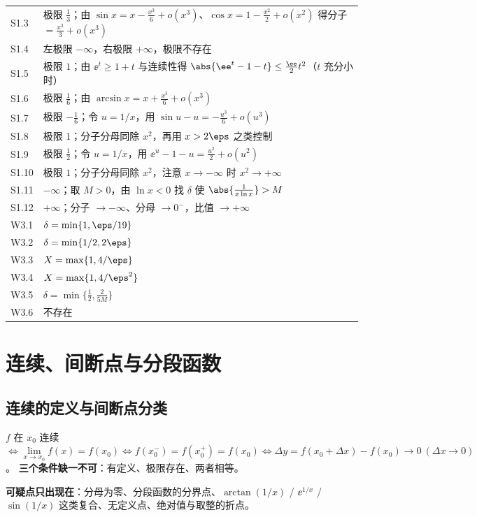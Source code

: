 \documentclass[11pt,a4paper]{ctexart}
\begin{document}
{\begin{longtable}{@{}p{1.6cm}p{13.0cm}@{}}
S1.3 & 极限 $\frac13$；由 $\sin x=x-\frac{x^{3}}{6}+o(x^{3})$、$\cos x=1-\frac{x^{2}}{2}+o(x^{2})$ 得分子 $=\frac{x^{3}}{3}+o(x^{3})$ \\
S1.4 & 左极限 $-\infty$，右极限 $+\infty$，极限不存在 \\
S1.5 & 极限 $1$；由 $\ee^{t}\geq1+t$ 与连续性得 $\abs{\ee^{t}-1-t}\leq\frac{\ee}{2}t^{2}$（$t$ 充分小时） \\
S1.6 & 极限 $\frac16$；由 $\arcsin x=x+\frac{x^{3}}{6}+o(x^{3})$ \\
S1.7 & 极限 $-\frac16$；令 $u=1/x$，用 $\sin u-u=-\frac{u^{3}}{6}+o(u^{3})$ \\
S1.8 & 极限 $1$；分子分母同除 $x^{2}$，再用 $x>2\eps$ 之类控制 \\
S1.9 & 极限 $\frac12$；令 $u=1/x$，用 $\ee^{u}-1-u=\frac{u^{2}}{2}+o(u^{2})$ \\
S1.10 & 极限 $1$；分子分母同除 $x^{2}$，注意 $x\to-\infty$ 时 $x^{2}\to+\infty$ \\
S1.11 & $-\infty$；取 $M>0$，由 $\ln x<0$ 找 $\delta$ 使 $\abs{\frac{1}{x\ln x}}>M$ \\
S1.12 & $+\infty$；分子 $\to-\infty$、分母 $\to0^{-}$，比值 $\to+\infty$ \\
W3.1 & $\delta=\min\{1,\eps/19\}$ \\
W3.2 & $\delta=\min\{1/2,2\eps\}$ \\
W3.3 & $X=\max\{1,4/\eps\}$ \\
W3.4 & $X=\max\{1,4/\eps^2\}$ \\
W3.5 & $\delta=\min\{\frac12,\frac{2}{5M}\}$ \\
W3.6 & 不存在
\end{longtable}}

\bigskip
\section{连续、间断点与分段函数}
\subsection{连续的定义与间断点分类}

\begin{keypoint}[连续的三等价说法]
$f$ 在 $x_0$ 连续 $\iff \lim\limits_{x\to x_0}f(x)=f(x_0)
\iff f(x_0^-)=f(x_0^+)=f(x_0)
\iff \Delta y=f(x_0+\Delta x)-f(x_0)\to0\ (\Delta x\to0)$。
\textbf{三个条件缺一不可}：有定义、极限存在、两者相等。
\end{keypoint}

\noindent\textbf{可疑点只出现在}：分母为零、分段函数的分界点、$\arctan(1/x)$ / $\ee^{1/x}$ / $\sin(1/x)$ 这类复合、无定义点、绝对值与取整的折点。
\end{document}
